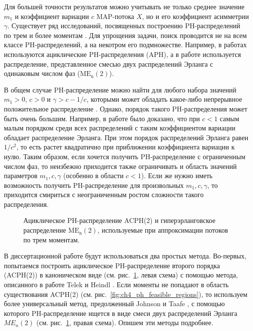 Для большей точности результатов можно учитывать не только среднее значение $m_1$ и коэффициент вариации $c$ MAP-потока $X$, но и его коэффициент асимметрии $\gamma$. Существует ряд исследований, посвященных построению PH-распределений по трем и более моментам \cite{Osogami2006,Bobbio2005,Johnson1989,Telek2003,Horvath2013a,VandenBosch2000,Horvath2007,Schmickler1992}. Для упрощения задачи, поиск проводится не на всем классе PH-распределений, а на некотром его подмножестве. Например, в работах \cite{Bobbio2005,Telek2003} используются ациклические PH-распределения (APH), а в работе \cite{Johnson1989} используется распределение, представленное смесью двух распределений Эрланга с одинаковым числом фаз ($\text{ME}_\text{n}(2)$).

В общем случае PH-распределение можно найти для любого набора значений $m_1 > 0$, $c > 0$ и $\gamma > c - 1/c$, которыми может обладать какое-либо непрерывное положительное распределение \cite{Johnson1989}. Однако, порядок такого PH-распределения может быть очень большим. Например, в работе \cite{Aldous1987} было доказано, что при $c < 1$ самым малым порядком среди всех распределений с таким коэффициентом вариации  обладает распределение Эрланга. При этом порядок распределений Эрланга равен $1 / c^2$, то есть растет квадратично при приближении коэффициента вариации к нулю. Таким образом, если хочется получить PH-распределение с ограниченным числом фаз, то неизбежно приходится также ограничивать и область значений параметров $m_1, c, \gamma$ (особенно в области $c < 1$). Если же нужно иметь возможность получить PH-распределение для произвольных $m_1, c, \gamma$, то приходится смириться с неограниченным ростом сложности такого распределения.

\begin{figure}[h]
  \caption{Ациклическое PH-распределение ACPH(2) и гиперэрланговское распределение $\text{ME}_\text{n}(2)$, используемые при аппроксимации потоков по трем моментам.}
  \label{fig:ch4_ph3}
\end{figure}

В диссертационной работе будут использоваться два простых метода. Во-первых, попытаемся построить ациклическое PH-распределение второго порядка (ACPH(2)) в каноническом виде (см. рис.~\ref{fig:ch4_ph3}, левая схема) с помощью метода, описанного в работе Telek и Heindl \cite{Telek2003}. Если моменты не попадают в область существования ACPH(2) (см. рис.~\ref{fig:ch4_ph_feasible_regions}), то используем более универсальный метод, предолженный Johnson и Taafe \cite{Johnson1989}, с помощью которого PH-распределение ищется в виде смеси двух распределений Эрланга $ME_n(2)$ (см. рис.~\ref{fig:ch4_ph3}, правая схема). Опишем эти методы подробнее.


